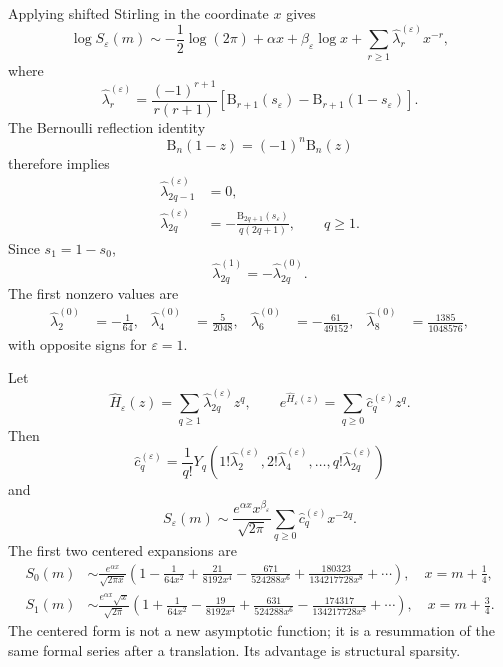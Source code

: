 \documentclass[11pt,a4paper]{article}
\theoremstyle{clean}
\theoremstyle{definition}
\newcommand{\eps}{\varepsilon}
\newcommand{\al}{\alpha}
\newcommand{\be}{\beta}
\newcommand{\B}{\mathrm B}
\begin{document}
Applying shifted Stirling in the coordinate \(x\) gives
\begin{equation}
 \log S_\eps(m)
 \sim -\frac12\log(2\pi)+\al x+\be_\eps\log x
 +\sum_{r\ge1}\widehat\lambda_r^{(\eps)}x^{-r},
 \label{eq:center-log}
\end{equation}
where
\begin{equation}
 \widehat\lambda_r^{(\eps)}=
 \frac{(-1)^{r+1}}{r(r+1)}
 \left[\B_{r+1}(s_\eps)-\B_{r+1}(1-s_\eps)\right].
 \label{eq:center-lambda-general}
\end{equation}
The Bernoulli reflection identity
\begin{equation}
 \B_n(1-z)=(-1)^n\B_n(z)
 \label{eq:Bernoulli-reflection}
\end{equation}
therefore implies
\begin{align}
 \widehat\lambda_{2q-1}^{(\eps)}&=0,
 \label{eq:center-odd-zero}\\
 \widehat\lambda_{2q}^{(\eps)}
 &=-\frac{\B_{2q+1}(s_\eps)}{q(2q+1)},
 \qquad q\ge1.
 \label{eq:center-even-coeff}
\end{align}
Since \(s_1=1-s_0\),
\begin{equation}
 \widehat\lambda_{2q}^{(1)}=-\widehat\lambda_{2q}^{(0)}.
 \label{eq:center-lambda-sign}
\end{equation}
The first nonzero values are
\begin{align}
 \widehat\lambda_2^{(0)}&=-\frac1{64},&
 \widehat\lambda_4^{(0)}&=\frac5{2048},&
 \widehat\lambda_6^{(0)}&=-\frac{61}{49152},&
 \widehat\lambda_8^{(0)}&=\frac{1385}{1048576},
 \label{eq:center-lambda-even-first}
\end{align}
with opposite signs for \(\eps=1\).

Let
\begin{equation}
 \widehat H_\eps(z)=\sum_{q\ge1}\widehat\lambda_{2q}^{(\eps)}z^q,
 \qquad
 e^{\widehat H_\eps(z)}=\sum_{q\ge0}\widehat c_q^{(\eps)}z^q.
 \label{eq:center-H-c}
\end{equation}
Then
\begin{equation}
 \widehat c_q^{(\eps)}=
 \frac1{q!}Y_q\!\left(
 1!\widehat\lambda_2^{(\eps)},
 2!\widehat\lambda_4^{(\eps)},\ldots,
 q!\widehat\lambda_{2q}^{(\eps)}
 \right)
 \label{eq:center-c-Bell}
\end{equation}
and
\begin{equation}
 \boxed{\displaystyle
 S_\eps(m)\sim\frac{e^{\al x}x^{\be_\eps}}{\sqrt{2\pi}}
 \sum_{q\ge0}\widehat c_q^{(\eps)}x^{-2q}.}
 \label{eq:center-direct}
\end{equation}
The first two centered expansions are
\begin{align}
 S_0(m)&\sim\frac{e^{\al x}}{\sqrt{2\pi x}}
 \left(1-\frac1{64x^2}+\frac{21}{8192x^4}
 -\frac{671}{524288x^6}+\frac{180323}{134217728x^8}+\cdots\right),
 \quad x=m+\frac14,
 \label{eq:center-even-direct}\\
 S_1(m)&\sim\frac{e^{\al x}\sqrt{x}}{\sqrt{2\pi}}
 \left(1+\frac1{64x^2}-\frac{19}{8192x^4}
 +\frac{631}{524288x^6}-\frac{174317}{134217728x^8}+\cdots\right),
 \quad x=m+\frac34.
 \label{eq:center-odd-direct}
\end{align}
The centered form is not a new asymptotic function; it is a resummation of the same formal series after a translation.  Its advantage is structural sparsity.
\end{document}
